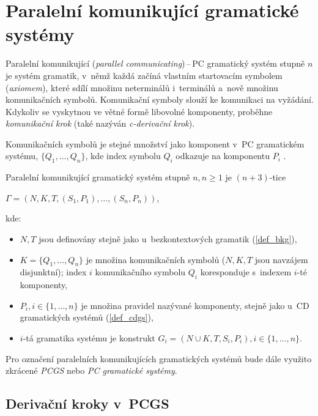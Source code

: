 \section{Paralelní komunikující gramatické systémy}
Paralelní komunikující (\emph{parallel communicating})\,--\,PC gramatický systém stupně $n$ je systém gramatik, v~němž každá začíná vlastním startovacím symbolem (\emph{axiomem}), které sdílí množinu neterminálů i~terminálů a~nově množinu komunikačních symbolů.
Komunikační symboly slouží ke komunikaci na vyžádání.
Kdykoliv se vyskytnou ve větné formě libovolné komponenty, proběhne \emph{komunikační krok} (také nazýván \emph{c-derivační krok}).

Komunikačních symbolů je stejné množství jako komponent v~PC gramatickém systému, $\{Q_1, \ldots, Q_n\}$, kde index symbolu $Q_i$ odkazuje na komponentu $P_i$ \cite{PCGS-chapter2}.
\begin{definition}
    Paralelní komunikující gramatický systém stupně $n, n \geq 1$ je $(n+3)$-tice
    \begin{center}
        $\Gamma = (N, K, T, (S_1, P_1), \ldots, (S_n, P_n))$,
    \end{center}
    kde:
    \begin{itemize}
        \item $N, T$ jsou definovány stejně jako u~bezkontextových gramatik (\ref{def_bkg}),
        \item $K = \{Q_1, \ldots, Q_n\}$ je množina komunikačních symbolů ($N, K, T$ jsou navzájem disjunktní); index $i$ komunikačního symbolu $Q_i$ koresponduje s~indexem $i$-té komponenty,
        \item $P_i, i \in \{1, \ldots, n\}$ je množina pravidel nazývané komponenty, stejně jako u~CD gramatických systémů (\ref{def_cdgs}),
        \item $i$-tá gramatika systému je konstrukt $G_i = (N \cup K, T, S_i, P_i), i \in \{1, \ldots, n\}$.
    \end{itemize}
\end{definition}

\begin{convention}
Pro označení paralelních komunikujících gramatických systémů bude dále využito zkrácené \emph{PCGS} nebo \emph{PC gramatické systémy}.
\end{convention}

\subsection*{Derivační kroky v~PCGS}

